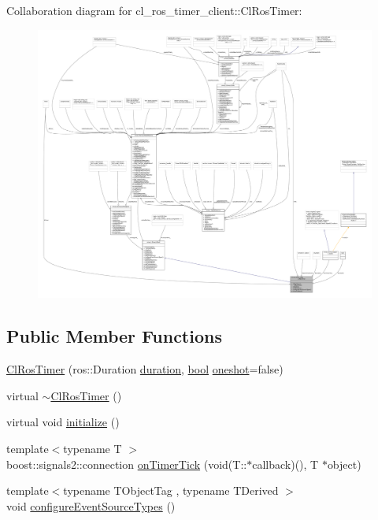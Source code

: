 Collaboration diagram for cl\+\_\+ros\+\_\+timer\+\_\+client\+:\+:Cl\+Ros\+Timer\+:
\nopagebreak
\begin{figure}[H]
\begin{center}
\leavevmode
\includegraphics[width=350pt]{classcl__ros__timer__client_1_1ClRosTimer__coll__graph}
\end{center}
\end{figure}
\subsection*{Public Member Functions}
\begin{DoxyCompactItemize}
\item 
\hyperlink{classcl__ros__timer__client_1_1ClRosTimer_ac75f833fdb826ef3b187be134446b3e3}{Cl\+Ros\+Timer} (ros\+::\+Duration \hyperlink{classcl__ros__timer__client_1_1ClRosTimer_aa9936966e5547dc21f8a5e9b75efe36e}{duration}, \hyperlink{classbool}{bool} \hyperlink{classcl__ros__timer__client_1_1ClRosTimer_a83f83f7acaef51bd8426c82e38f9a36e}{oneshot}=false)
\item 
virtual \hyperlink{classcl__ros__timer__client_1_1ClRosTimer_a60a7d2b4a38c1ebd7880c211f43c76a2}{$\sim$\+Cl\+Ros\+Timer} ()
\item 
virtual void \hyperlink{classcl__ros__timer__client_1_1ClRosTimer_abf6313447f89e66109fab4594511d4bb}{initialize} ()
\item 
{\footnotesize template$<$typename T $>$ }\\boost\+::signals2\+::connection \hyperlink{classcl__ros__timer__client_1_1ClRosTimer_ac2d4e684325731df4dc4fc5b7b8a9dbd}{on\+Timer\+Tick} (void(T\+::$\ast$callback)(), T $\ast$object)
\item 
{\footnotesize template$<$typename T\+Object\+Tag , typename T\+Derived $>$ }\\void \hyperlink{classcl__ros__timer__client_1_1ClRosTimer_a4d0d84494a8a3279302cd1eeeb7837b7}{configure\+Event\+Source\+Types} ()
\end{DoxyCompactItemize}

